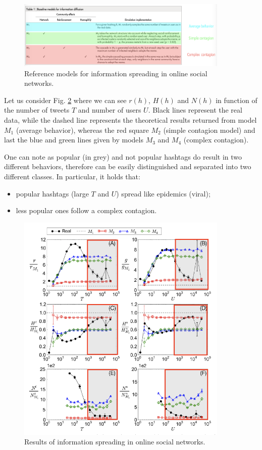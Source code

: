 \documentclass[../main/main.tex]{subfiles}
\begin{document}
\begin{figure}[h!]
\centering
\includegraphics[width=0.9\textwidth]{../lessons/image/11/5.png}
\caption{\label{fig:11_5} Reference models for information spreading in online social networks.}
\end{figure}

Let us consider Fig. \ref{fig:11_6} where we can see \( r(h) \), \( H(h) \) and \( N(h) \) in function of the number of tweets \( T \) and number of users \( U \).
Black lines represent the real data, while the dashed line represents the theoretical results returned from model \( M_1 \) (average behavior), whereas the red square \( M_2 \) (simple contagion model) and last the blue and green lines given by models \( M_3 \) and \( M_4 \) (complex contagion).

One can note as popular (in grey) and not popular hashtags do result in two different behaviors, therefore can be easily distinguished and separated into two different classes.
In particular, it holds that:
\begin{itemize}
\item popular hashtags (large $T$ and $U$) spread like epidemics (viral);
\item less popular ones follow a complex contagion.
\end{itemize}

\begin{figure}[h!]
\centering
\includegraphics[width=0.9\textwidth]{../lessons/image/11/6.png}
\caption{\label{fig:11_6} Results of information spreading in online social networks.}
\end{figure}
\end{document}
